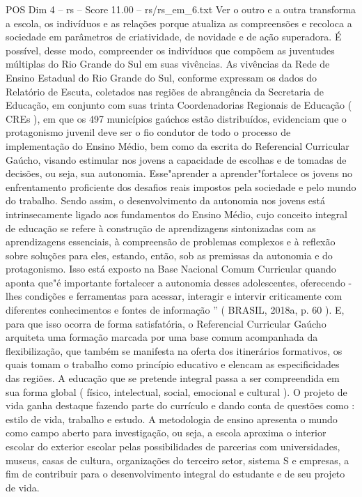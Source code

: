\begin{textsample}{POS Dim 4 – rs – Score 11.00 – rs/rs\_em\_6.txt}
Ver o outro e a outra transforma a escola, os indivíduos e as relações porque atualiza as compreensões e recoloca a sociedade em parâmetros de criatividade, de novidade e de ação superadora.
É possível, desse modo, compreender os indivíduos que compõem as juventudes múltiplas do Rio Grande do Sul em suas vivências.
As vivências da Rede de Ensino Estadual do Rio Grande do Sul, conforme expressam os dados do Relatório de Escuta, coletados nas regiões de abrangência da Secretaria de Educação, em conjunto com suas trinta Coordenadorias Regionais de Educação ( CREs ), em que os 497 municípios gaúchos estão distribuídos, evidenciam que o protagonismo juvenil deve ser o fio condutor de todo o processo de implementação do Ensino Médio, bem como da escrita do Referencial Curricular Gaúcho, visando estimular nos jovens a capacidade de escolhas e de tomadas de decisões, ou seja, sua autonomia.
Esse"aprender a aprender"fortalece os jovens no enfrentamento proficiente dos desafios reais impostos pela sociedade e pelo mundo do trabalho.
Sendo assim, o desenvolvimento da autonomia nos jovens está intrinsecamente ligado aos fundamentos do Ensino Médio, cujo conceito integral de educação se refere à construção de aprendizagens sintonizadas com as aprendizagens essenciais, à compreensão de problemas complexos e à reflexão sobre soluções para eles, estando, então, sob as premissas da autonomia e do protagonismo.
Isso está exposto na Base Nacional Comum Curricular quando aponta que"é importante fortalecer a autonomia desses adolescentes, oferecendo -lhes condições e ferramentas para acessar, interagir e intervir criticamente com diferentes conhecimentos e fontes de informação ” ( BRASIL, 2018a, p. 60 ).
E, para que isso ocorra de forma satisfatória, o Referencial Curricular Gaúcho arquiteta uma formação marcada por uma base comum acompanhada da flexibilização, que também se manifesta na oferta dos itinerários formativos, os quais tomam o trabalho como princípio educativo e elencam as especificidades das regiões.
A educação que se pretende integral passa a ser compreendida em sua forma global ( físico, intelectual, social, emocional e cultural ).
O projeto de vida ganha destaque fazendo parte do currículo e dando conta de questões como : estilo de vida, trabalho e estudo.
A metodologia de ensino apresenta o mundo como campo aberto para investigação, ou seja, a escola aproxima o interior escolar do exterior escolar pelas possibilidades de parcerias com universidades, museus, casas de cultura, organizações do terceiro setor, sistema S e empresas, a fim de contribuir para o desenvolvimento integral do estudante e de seu projeto de vida.

\end{textsample}
